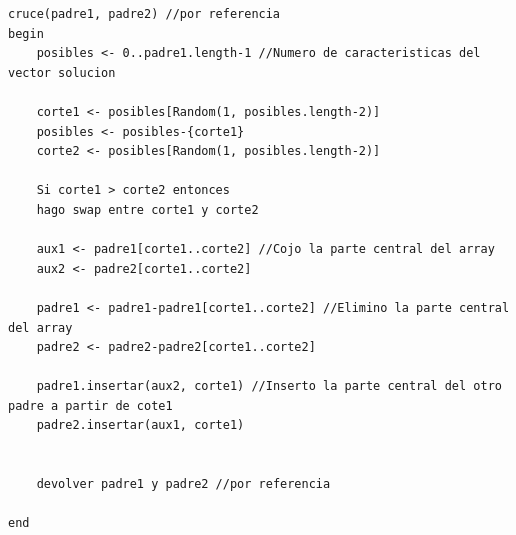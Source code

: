 \begin{lstlisting}
cruce(padre1, padre2) //por referencia
begin
	posibles <- 0..padre1.length-1 //Numero de caracteristicas del vector solucion
	
	corte1 <- posibles[Random(1, posibles.length-2)]
	posibles <- posibles-{corte1}
	corte2 <- posibles[Random(1, posibles.length-2)]
	
	Si corte1 > corte2 entonces
	hago swap entre corte1 y corte2
	
	aux1 <- padre1[corte1..corte2] //Cojo la parte central del array
	aux2 <- padre2[corte1..corte2]
	
	padre1 <- padre1-padre1[corte1..corte2] //Elimino la parte central del array
	padre2 <- padre2-padre2[corte1..corte2]
	
	padre1.insertar(aux2, corte1) //Inserto la parte central del otro padre a partir de cote1
	padre2.insertar(aux1, corte1)
	
	
	devolver padre1 y padre2 //por referencia

end
\end{lstlisting}


